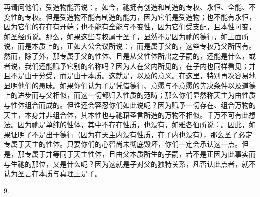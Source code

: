 再请问他们，受造物能否说：。如今，祂拥有创造和制造的专权、永恒、全能、不变性的专权。但是受造物不能有制造的能力，因为它们是受造物；也不能有永恒，因为它们的存在有开端；也不能有全能与不变性，因为它们受支配，且本性可变，如圣经所说。那么，如果这些专权属于圣子，显然不是因为祂的德行，如上面所说，而是本质上的，正如大公会议所说：，而是属于父的，这些专权乃父所固有。然而，除了外，那专属于父的性体、且是从父性体所出之子嗣的，还能是什么，或者说，我们还能赋予它别的名称吗？因为人在父内所见的，在子内也同样看见；并且不是由于分受，而是由于本质。这就是，以及的意义。在这里，特别再次容易地显明他们的愚昧。如果你们认为子是凭借德行、意愿与不意愿的先决条件以及道德上的进步而与父相似，而这一切都归入性质的范畴；那么你们显然称天主为由性质与性体组合而成的。但谁还会容忍你们如此说呢？因为赋予一切存在、组合万物的天主，本身并非组合体，其本性也与祂藉圣言所造的万物不相似。千万不可有此想法。因为祂是单纯的性体，其中不存在性质，也没有，如雅各伯所说：。因此，如果证明了不是出于德行（因为在天主内没有性质，在子内也没有），那么圣子必定专属于天主的性体。只要你们的心智尚未彻底毁坏，你们一定会承认这一点。但是，那专属于并等同于天主性体，且由父本质所生的子嗣，若不是正因为此事实而与生祂的那位，又是什么呢？因为这就是子对父的独特关系，凡否认此点者，就不认为圣言在本质与真理上是子。\par

9. \par

